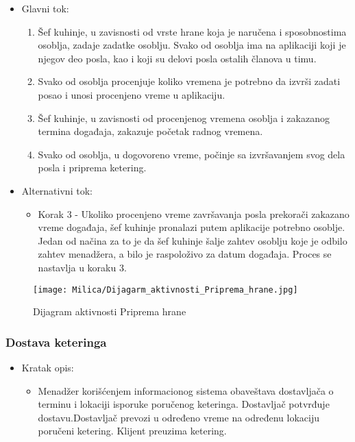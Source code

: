 \documentclass[a4paper]{article}
\begin{document}
      \begin{itemize}
        \item Glavni tok:
          \begin{enumerate}
              
        
              \item Šef kuhinje, u zavisnosti od vrste hrane koja je naručena i sposobnostima osoblja, zadaje zadatke osoblju. Svako od osoblja ima na aplikaciji koji je njegov deo posla, kao i koji su delovi posla ostalih članova u timu. 
        
              \item Svako od osoblja procenjuje koliko vremena je potrebno da izvrši zadati posao i  unosi procenjeno vreme u aplikaciju.
         
              \item Šef kuhinje, u zavisnosti od procenjenog vremena osoblja i zakazanog termina događaja, zakazuje početak radnog vremena.
       
              \item Svako od osoblja, u dogovoreno vreme,  počinje sa izvršavanjem svog dela posla i priprema ketering.
          
          \end{enumerate}
    \end{itemize}
      \begin{itemize}
        \item Alternativni tok:
          \begin{itemize}
        \item Korak 3 - Ukoliko procenjeno vreme završavanja posla prekorači zakazano vreme događaja, šef kuhinje pronalazi putem aplikacije potrebno osoblje. Jedan od načina za to je da šef kuhinje šalje zahtev osoblju koje je odbilo zahtev menadžera, a bilo je raspoloživo za datum događaja. Proces se nastavlja u koraku 3.
    \end{itemize}
    \end{itemize}
    
\begin{figure}[H]
    \centering
    \texttt{[image: Milica/Dijagarm\_aktivnosti\_Priprema\_hrane.jpg]}
    \caption{Dijagram aktivnosti Priprema hrane }
    \label{fig:RegistracijaZ}
\end{figure}
    

\subsubsection{Dostava keteringa}
\begin{itemize}
    \item Kratak opis:
    \begin{itemize}
 
        \item Menadžer korišćenjem informacionog sistema obaveštava dostavljača o terminu i lokaciji isporuke poručenog keteringa. Dostavljač potvrđuje dostavu.Dostavljač prevozi u određeno vreme na određenu lokaciju poručeni ketering.
        Klijent preuzima ketering.
    \end{itemize}
    
    
\end{itemize}
\end{document}
